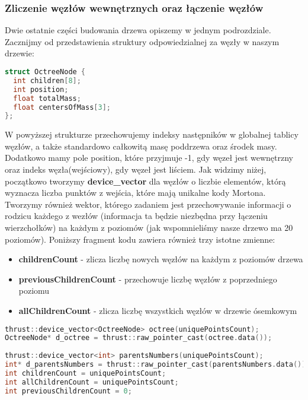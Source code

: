 \documentclass[14pt,twoside,a4paper]{article}
\theoremstyle{definition}
\begin{document}
\subsubsection{\large Zliczenie węzłów wewnętrznych oraz łączenie węzłów}

Dwie ostatnie części budowania drzewa opiszemy w jednym podrozdziale.
Zacznijmy od przedstawienia struktury odpowiedzialnej za węzły w naszym drzewie:

\begin{lstlisting}[language=C++, frame=single, framerule=2pt, caption=Struktura OctreeNode]
struct OctreeNode {
  int children[8];
  int position;
  float totalMass;
  float centersOfMass[3];
};
\end{lstlisting}
W powyższej strukturze przechowujemy indeksy następników w globalnej tablicy węzłów, a także standardowo całkowitą masę poddrzewa oraz środek masy. Dodatkowo mamy pole position, które przyjmuje -1, gdy węzeł jest wewnętrzny oraz indeks węzła(wejściowy), gdy węzeł jest liściem.
Jak widzimy niżej, początkowo tworzymy \textbf{device\_vector} dla węzłów o liczbie elementów, którą wyznacza liczba punktów z wejścia, które mają unikalne kody Mortona. \\
Tworzymy również wektor, którego zadaniem jest przechowywanie informacji o rodzicu każdego z wezłów (informacja ta będzie niezbędna przy łączeniu wierzchołków) na każdym z poziomów (jak wspomnieliśmy nasze drzewo ma 20 poziomów). Poniższy fragment kodu zawiera również trzy istotne zmienne:
\begin{itemize}
\item \textbf{childrenCount} - zlicza liczbę nowych węzłów na każdym z poziomów drzewa
\item \textbf{previousChildrenCount} - przechowuje liczbę węzłów z poprzedniego poziomu
\item \textbf{allChildrenCount} - zlicza liczbę wszystkich węzłów w drzewie ósemkowym
\end{itemize}

\begin{lstlisting}[language=C++, frame=single, framerule=2pt, caption=Kroki 5-6]
thrust::device_vector<OctreeNode> octree(uniquePointsCount);
OctreeNode* d_octree = thrust::raw_pointer_cast(octree.data());
	
thrust::device_vector<int> parentsNumbers(uniquePointsCount);
int* d_parentsNumbers = thrust::raw_pointer_cast(parentsNumbers.data());
int childrenCount = uniquePointsCount;
int allChildrenCount = uniquePointsCount;
int previousChildrenCount = 0;
\end{lstlisting}
\end{document}
